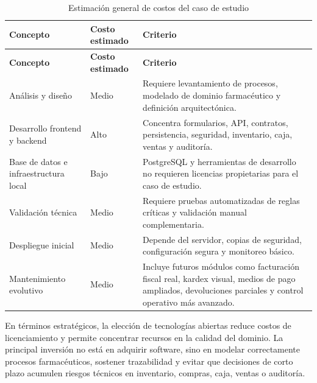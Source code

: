 \begin{longtable}{p{}p{}p{}}
\caption{Estimación general de costos del caso de estudio}\\
\toprule
\textbf{Concepto} & \textbf{Costo estimado} & \textbf{Criterio}\\
\midrule
\endfirsthead
\toprule
\textbf{Concepto} & \textbf{Costo estimado} & \textbf{Criterio}\\
\midrule
\endhead
Análisis y diseño & Medio & Requiere levantamiento de procesos, modelado de dominio farmacéutico y definición arquitectónica.\\
Desarrollo frontend y backend & Alto & Concentra formularios, API, contratos, persistencia, seguridad, inventario, caja, ventas y auditoría.\\
Base de datos e infraestructura local & Bajo & PostgreSQL y herramientas de desarrollo no requieren licencias propietarias para el caso de estudio.\\
Validación técnica & Medio & Requiere pruebas automatizadas de reglas críticas y validación manual complementaria.\\
Despliegue inicial & Medio & Depende del servidor, copias de seguridad, configuración segura y monitoreo básico.\\
Mantenimiento evolutivo & Medio & Incluye futuros módulos como facturación fiscal real, kardex visual, medios de pago ampliados, devoluciones parciales y control operativo más avanzado.\\
\bottomrule
\end{longtable}

En términos estratégicos, la elección de tecnologías abiertas reduce costos de licenciamiento y permite concentrar recursos en la calidad del dominio. La principal inversión no está en adquirir software, sino en modelar correctamente procesos farmacéuticos, sostener trazabilidad y evitar que decisiones de corto plazo acumulen riesgos técnicos en inventario, compras, caja, ventas o auditoría.
